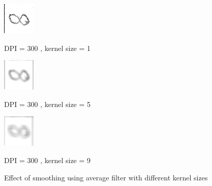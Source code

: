 \begin{figure}[H]
\vspace*{0.5cm} %
	\begin{minipage}[t]{0.30\textwidth}
		\centering
			\includegraphics[width=0.4\linewidth]{figure/mikael_8_2_dpi300_k1.png}
			\caption{DPI = 300 , kernel size = 1}
			\label{fig:dpi_300_5}
	\end{minipage}
\hspace{\fill}	
	\begin{minipage}[t]{0.30\textwidth}
		\centering
			\includegraphics[width=0.4\linewidth]{figure/mikael_8_2_dpi300_k5.png}
			\caption{DPI = 300 , kernel size = 5}
			\label{fig:dpi_300_9}
	\end{minipage}	
\hspace{\fill}	
	\begin{minipage}[t]{0.30\textwidth}
		\centering
			\includegraphics[width=0.4\linewidth]{figure/mikael_8_2_dpi300_k9.png}
			\caption{DPI = 300 , kernel size = 9}
			\label{fig:dpi_300_9}
	\end{minipage}	
\caption{Effect of smoothing using average filter with different kernel sizes}
\label{fig:average_filter}
\end{figure}

